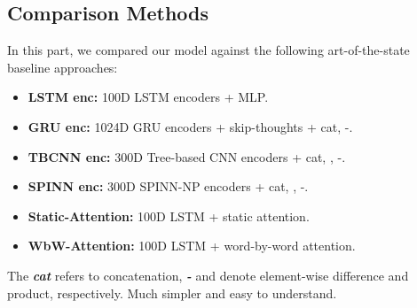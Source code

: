 \documentclass[11pt,letterpaper]{article}
\begin{document}
\subsection{Comparison Methods}
In this part, we compared our model against the following art-of-the-state baseline approaches:
\begin{small}
\begin{itemize}
\setlength{\itemsep}{0pt}
\setlength{\parsep}{0pt}
\setlength{\parskip}{0pt}
  \item \textbf{LSTM enc:} 100D LSTM encoders + MLP. ~\cite{bowman2015large}
\item \textbf{GRU enc:} 1024D GRU encoders + skip-thoughts + cat, -. ~\cite{vendrov2015order}
  \item \textbf{TBCNN enc:} 300D Tree-based CNN encoders + cat,  , -. ~\cite{mou2015recognizing}
  \item \textbf{SPINN enc:} 300D SPINN-NP encoders + cat,  , -. ~\cite{bowman2016fast}
  \item \textbf{Static-Attention:} 100D LSTM + static attention. ~\cite{rocktaschel2015reasoning}
  \item \textbf{WbW-Attention:} 100D LSTM + word-by-word attention. ~\cite{rocktaschel2015reasoning}
\end{itemize}
\end{small}
The \emph{\textbf{cat}} refers to concatenation, \emph{\textbf{-}} and \textbf{} denote element-wise difference and product, respectively.
Much simpler and easy to understand.
\end{document}
